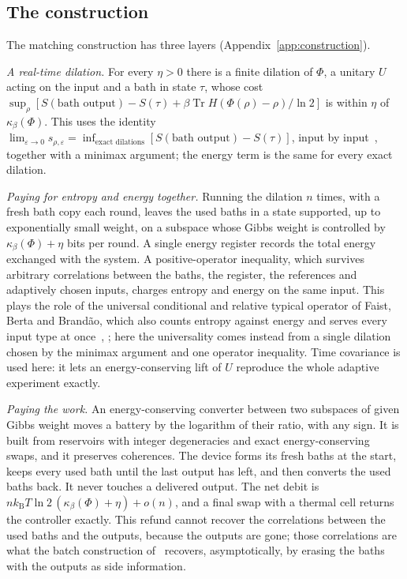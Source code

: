 \documentclass[11pt]{article}
\theoremstyle{definition}
\theoremstyle{remark}
\newcommand{\Tr}{\operatorname{Tr}}
\newcommand{\kB}{k_{\mathrm B}}
\newcommand{\Trt}{\kappa_\beta}
\begin{document}
\subsection{The construction}

The matching construction has three layers (Appendix~\ref{app:construction}).

\emph{A real-time dilation.} For every $\eta>0$ there is a finite dilation of $\Phi$, a unitary $U$ acting on the input and a bath in state $\tau$, whose cost $\sup_\rho[S(\text{bath output})-S(\tau)+\beta\Tr H(\Phi(\rho)-\rho)/\ln2]$ is within $\eta$ of $\Trt(\Phi)$. This uses the identity $\lim_{\varepsilon\to0}s_{\rho,\varepsilon}=\inf_{\text{exact dilations}}[S(\text{bath output})-S(\tau)]$, input by input~\cite{ClosedMemory}, together with a minimax argument; the energy term is the same for every exact dilation.

\emph{Paying for entropy and energy together.} Running the dilation $n$ times, with a fresh bath copy each round, leaves the used baths in a state supported, up to exponentially small weight, on a subspace whose Gibbs weight is controlled by $\Trt(\Phi)+\eta$ bits per round. A single energy register records the total energy exchanged with the system. A positive-operator inequality, which survives arbitrary correlations between the baths, the register, the references and adaptively chosen inputs, charges entropy and energy on the same input. This plays the role of the universal conditional and relative typical operator of Faist, Berta and Brand\~ao, which also counts entropy against energy and serves every input type at once~\cite{FBB19}, \cite[Sec.~6]{FBB21}; here the universality comes instead from a single dilation chosen by the minimax argument and one operator inequality. Time covariance is used here: it lets an energy-conserving lift of $U$ reproduce the whole adaptive experiment exactly.

\emph{Paying the work.} An energy-conserving converter between two subspaces of given Gibbs weight moves a battery by the logarithm of their ratio, with any sign. It is built from reservoirs with integer degeneracies and exact energy-conserving swaps, and it preserves coherences. The device forms its fresh baths at the start, keeps every used bath until the last output has left, and then converts the used baths back. It never touches a delivered output. The net debit is $n\kB T\ln2\,(\Trt(\Phi)+\eta)+o(n)$, and a final swap with a thermal cell returns the controller exactly. This refund cannot recover the correlations between the used baths and the outputs, because the outputs are gone; those correlations are what the batch construction of~\cite[Sec.~7]{FBB21} recovers, asymptotically, by erasing the baths with the outputs as side information.
\end{document}
